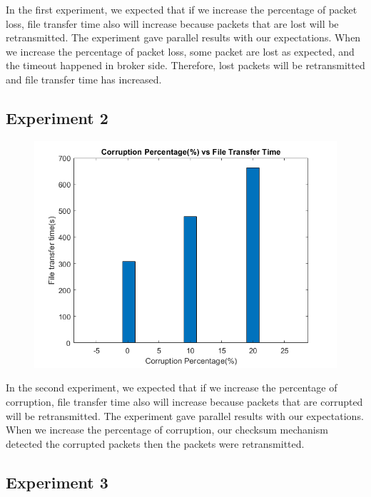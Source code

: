 \documentclass[conference]{IEEEtran}
\begin{document}
In the first experiment, we expected that if we increase the percentage of packet loss, file transfer time also will increase because packets that are lost will be retransmitted. The experiment gave parallel results with our expectations. When we increase the percentage of packet loss, some packet are lost as expected, and the timeout happened in broker side. Therefore, lost packets will be retransmitted and file transfer time has increased.

\newpage

\subsection*{Experiment 2}

\begin{figure}[h]
\centerline{\includegraphics[scale=0.5]{exp2.png}}
\caption{}
\label{fig}
\end{figure}

In the second experiment, we expected that if we increase the percentage of corruption, file transfer time also will increase because packets that are corrupted will be retransmitted. The experiment gave parallel results with our expectations. When we increase the percentage of corruption, our checksum mechanism detected the corrupted packets then the packets were retransmitted.
\subsection*{Experiment 3}
\end{document}
